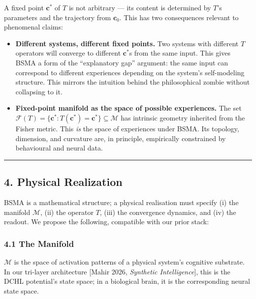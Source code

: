 \documentclass[
  11pt,
  a4paper,
]{article}
\providecommand{\tightlist}{%
  \setlength{\itemsep}{0pt}\setlength{\parskip}{0pt}}
\begin{document}
A fixed point \(\mathbf{c}^*\) of \(T\) is not arbitrary --- its content
is determined by \(T\)'s parameters and the trajectory from
\(\mathbf{c}_0\). This has two consequences relevant to phenomenal
claims:

\begin{itemize}
\tightlist
\item
  \textbf{Different systems, different fixed points.} Two systems with
  different \(T\) operators will converge to different \(\mathbf{c}^*\)s
  from the same input. This gives BSMA a form of the ``explanatory gap''
  argument: the same input can correspond to different experiences
  depending on the system's self-modeling structure. This mirrors the
  intuition behind the philosophical zombie without collapsing to it.
\item
  \textbf{Fixed-point manifold as the space of possible experiences.}
  The set
  \(\mathcal{F}(T) = \{\mathbf{c}^* : T(\mathbf{c}^*) = \mathbf{c}^*\} \subseteq \mathcal{M}\)
  has intrinsic geometry inherited from the Fisher metric. This
  \emph{is} the space of experiences under BSMA. Its topology,
  dimension, and curvature are, in principle, empirically constrained by
  behavioural and neural data.
\end{itemize}

\begin{center}\rule{0.5\linewidth}{0.5pt}\end{center}

\subsection{4. Physical Realization}\label{physical-realization}

BSMA is a mathematical structure; a physical realisation must specify
(i) the manifold \(\mathcal{M}\), (ii) the operator \(T\), (iii) the
convergence dynamics, and (iv) the readout. We propose the following,
compatible with our prior stack:

\subsubsection{4.1 The Manifold}\label{the-manifold}

\(\mathcal{M}\) is the space of activation patterns of a physical
system's cognitive substrate. In our tri-layer architecture {[}Mahir
2026, \emph{Synthetic Intelligence}{]}, this is the DCHL potential's
state space; in a biological brain, it is the corresponding neural state
space.
\end{document}
